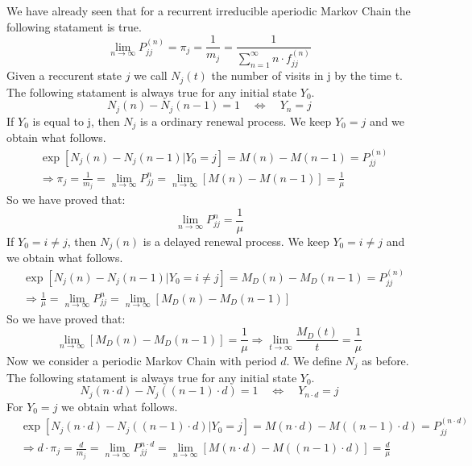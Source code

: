 We have already seen that for a recurrent irreducible aperiodic Markov Chain the following statament is true.
\begin{equation}
	\lim_{n \to \infty} P_{jj}^{(n)}=\pi_j=\frac{1}{m_j}=\frac{1}{\sum_{n=1}^{\infty}n \cdot f_{jj}^{(n)}}
\end{equation}
Given a reccurent state $j$ we call $N_j(t)$ the number of visits in j by the time t. The following statament is always true for any initial state $Y_0$.
\begin{equation}
	N_j(n)-N_j(n-1)=1 \quad \Leftrightarrow \quad Y_n=j
\end{equation}
If $Y_0$ is equal to j, then $N_j$ is a ordinary renewal process. We keep $Y_0=j$ and we obtain what follows.
\begin{align*}
	& \exp[N_j(n)-N_j(n-1)|Y_0=j]=M(n)-M(n-1)=P_{jj}^{(n)}
	\\ & \Rightarrow \pi_j=\frac{1}{m_j}=\lim_{n \to \infty} P_{jj}^{n} = \lim_{n \to \infty} [M(n)-M(n-1)]=\frac{1}{\mu}
\end{align*}
So we have proved that:
\begin{equation}
	\lim_{n \to \infty} P_{jj}^{n}=\frac{1}{\mu}
\end{equation}
If $Y_0=i \neq j$, then $N_j(n)$ is a delayed renewal process. We keep $Y_0=i \neq j$ and we obtain what follows.
\begin{align*}
	& \exp[N_j(n)-N_j(n-1)|Y_0=i \neq j]=M_D(n)-M_D(n-1)=P_{jj}^{(n)}
	\\ & \Rightarrow \frac{1}{\mu}=\lim_{n \to \infty} P_{jj}^{n} = \lim_{n \to \infty} [M_D(n)-M_D(n-1)]
\end{align*}
So we have proved that:
\begin{equation}
	\lim_{n \to \infty} [M_D(n)-M_D(n-1)]=\frac{1}{\mu} \Rightarrow \lim_{t \to \infty }\frac{M_D(t)}{t}=\frac{1}{\mu}
\end{equation}
Now we consider a periodic Markov Chain with period $d$. We define $N_j$ as before. The following statament is always true for any initial state $Y_0$.
\begin{equation}
	N_j(n \cdot d)-N_j((n-1)\cdot d)=1 \quad \Leftrightarrow \quad Y_{n \cdot d}=j
\end{equation}
For $Y_0=j$ we obtain what follows.
\begin{align*}
	& \exp[N_j(n \cdot d)-N_j((n-1)\cdot d)|Y_0=j]=M(n \cdot d)-M((n-1)\cdot d)=P_{jj}^{(n \cdot d)}
	\\ & \Rightarrow d \cdot \pi_j=\frac{d}{m_j}=\lim_{n \to \infty} P_{jj}^{n \cdot d} = \lim_{n \to \infty} [ M(n \cdot d)- M( (n-1) \cdot d)]=\frac{d}{\mu}
\end{align*}
